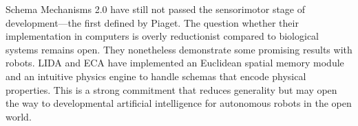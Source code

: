 \documentclass[runningheads]{llncs}
\begin{document}
Schema Mechanisms 2.0 have still not passed the sensorimotor stage of development\hspace{0pt}---the first defined by Piaget. 
The question whether their implementation in computers is overly reductionist compared to biological systems remains open.
They nonetheless demonstrate some promising results with robots. 
LIDA and ECA have implemented an Euclidean spatial memory module and an intuitive physics engine to handle schemas that encode physical properties. 
This is a strong commitment that reduces generality but may open the way to developmental artificial intelligence for autonomous robots in the open world. 




\end{document}
